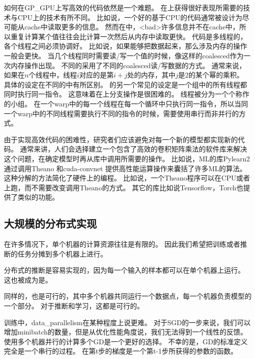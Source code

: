 如何在\gls{GP_GPU}上写高效的代码依然是一个难题。
在上获得很好表现所需要的技术与CPU上的技术有所不同。
比如说，一个好的基于CPU的代码通常被设计为尽可能从cache中读取更多的信息。
然而在中，<bad>许多信息并不在cache中，所以重复计算某个值往往会比计算一次然后从内存中读取更快。
代码是多线程的，各个线程之间必须协调好。
比如说，如果能够把数据起来，那么涉及内存的操作一般会更快。
当几个线程同时需要读/写一个值的时候，像这样的\gls{coalesced}作为一次内存操作出现。
不同的采用了不同的\gls{coalesced}读/写数据的方式。
通常来说，如果在$n$个线程中，线程$i$对应的是第$i+j$处的内存，其中$j$是2的某个幂的乘积。
具体的设定在不同的中有所区别。
的另一个常见的设定是一个组中的所有线程都同时执行同一指令。
这意味着在上分支操作是很困难的。
线程被分为一个个称作的小组。
在一个\gls{warp}中的每一个线程在每一个循环中只执行同一指令，所以当同一个\gls{warp}中的不同线程需要执行不同的指令的时候，需要使用串行而非并行的方式。


由于实现高效代码的困难性，研究者们应该避免对每一个新的模型都实现新的代码。
通常来讲，人们会选择建立一个包含了高效的卷积矩阵乘法的软件库来解决这个问题，在确定模型时再从库中调用所需要的操作。
比如说，\gls{ML}的库Pylearn2  \citep{pylearn2_arxiv_2013}通过调用Theano \citep{bergstra+al:2010-scipy-short,Bastien-2012}和cuda-convnet \citep{Krizhevsky2010tr}提供高性能运算操作来囊括了许多\gls{ML}的算法。
这种分解的方法简化了硬件上的编程。
比如说，一个Theano程序可以在CPU或者上跑，而不需要改变调用Theano的方式。
其它的库比如说Tensorflow\citep{tensorflow}，Torch\citep{Torch-2011}也提供了类似的功能。


\subsection{大规模的分布式实现}
\label{sec:large_scale_distributed_implementations}

在许多情况下，单个机器的计算资源往往是有限的。
因此我们希望把训练或者推断的任务分摊到多个机器上进行。

分布式的推断是容易实现的，因为每一个输入的样本都可以在单个机器上运行。
这也被成为是。

同样的，也是可行的，其中多个机器共同运行一个数据点，每一个机器负责模型的一个部分。
对于推断和学习，这都是可行的。


训练中，\gls{data_parallelism}在某种程度上说更难。
对于\gls{SGD}的一步来说，我们可以增加\gls{minibatch}的数量，但是从优化性能角度说，我们无法得到一个线性的反馈。
使用多个机器并行的计算多个\gls{GD}是一个更好的选择。
不幸的是，\gls{GD}的标准定义完全是一个串行的过程。
在第t步的梯度是一个第t-1步所获得的参数的函数。


